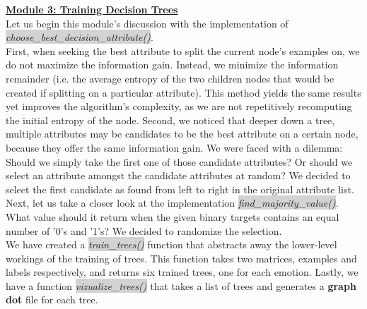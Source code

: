 \textbf{\underline{Module 3: Training Decision Trees}} \\
Let us begin this module's discussion with the implementation of  \colorbox{lightgray}{\emph{choose\_best\_decision\_attribute()}}. \\
First, when seeking the best attribute to split the current node's examples on, we do not maximize the information gain.
Instead, we minimize the information remainder (i.e. the average entropy of the two children nodes
that would be created if splitting on a particular attribute).
This method yields the same results yet improves the algorithm's complexity,
as we are not repetitively recomputing the initial entropy of the node.
Second, we noticed that deeper down a tree, multiple attributes may be candidates to be the best attribute on a certain node,
because they offer the same information gain. We were faced with a dilemma: Should we simply
take the first one of those candidate attributes? Or should we select an attribute amongst the candidate attributes at random?
We decided to select the first candidate as found from left to right in the original attribute list.\\
Next, let us take a closer look at the implementation  \colorbox{lightgray}{\emph{find\_majority\_value()}}.\\
What value should it return when the given binary targets contains an equal number of
'0's and '1's? We decided to randomize the selection.\\
We have created a  \colorbox{lightgray}{\emph{train\_trees()}} function that abstracts away the lower-level workings of the training
of trees. This function takes two matrices, examples and labels respectively,
and returns six trained trees, one for each emotion.
Lastly, we have a function  \colorbox{lightgray}{\emph{vizualize\_trees()}} that takes a list of trees and generates a \textbf{graph dot} file
for each tree.

